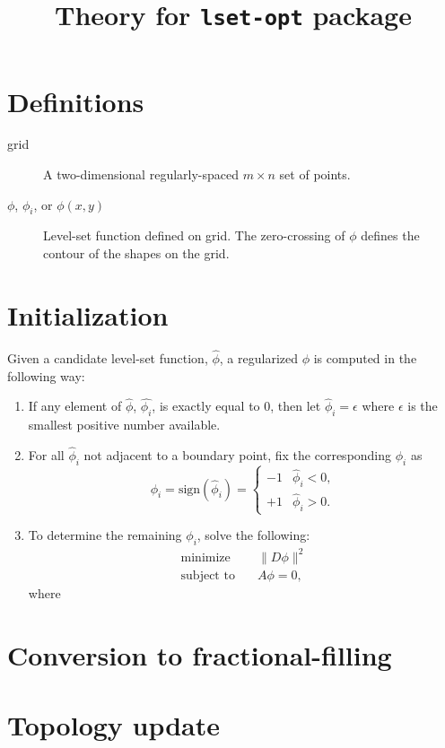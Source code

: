 \documentclass{article}
\title{Theory for \texttt{lset-opt} package}
\begin{document}
\maketitle
\tableofcontents

\section{Definitions}
\begin{description}
    \item[grid] A two-dimensional regularly-spaced $m \times n$ set of points.
    \item[$\phi$, $\phi_i$, or $\phi(x,y)$] Level-set function defined on grid. The zero-crossing of $\phi$ defines the contour of the shapes on the grid.
\end{description}

\section{Initialization}
Given a candidate level-set function, $\hat{\phi}$, a regularized $\phi$ is computed in the following way:
\begin{enumerate}
    \item If any element of $\hat{\phi}$, $\hat{\phi_i}$, is exactly equal to 0, then let $\hat{\phi}_i = \epsilon$ where $\epsilon$ is the smallest positive number available.
    \item For all $\hat{\phi}_i$ not adjacent to a boundary point, fix the corresponding $\phi_i$ as 
    \begin{equation}
        \phi_i = \text{sign}(\hat{\phi}_i) = 
        \begin{cases}
            -1& \hat{\phi}_i < 0, \\
            +1&  \hat{\phi}_i > 0.
        \end{cases}
    \end{equation}
    \item To determine the remaining $\phi_i$, solve the following:
    \begin{align}
        \text{minimize} \quad & \| D \phi \|^2 \\
        \text{subject to} \quad & A \phi = 0,
    \end{align}
    where
\end{enumerate}
\section{Conversion to fractional-filling}
\section{Topology update}
\end{document}
